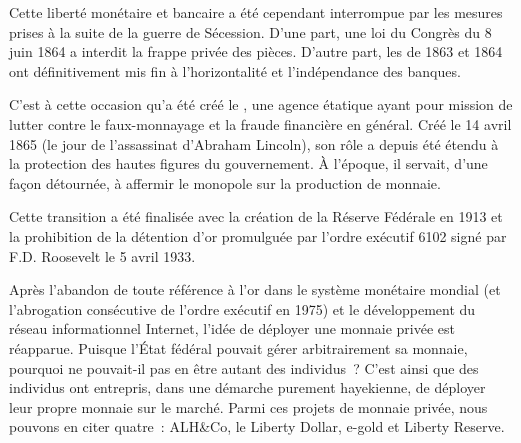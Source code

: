 Cette liberté monétaire et bancaire a été cependant interrompue par les mesures prises à la suite de la guerre de Sécession. D'une part, une loi du Congrès du 8 juin 1864 a interdit la frappe privée des pièces. D'autre part, les  de 1863 et 1864 ont définitivement mis fin à l'horizontalité et l'indépendance des banques.

C'est à cette occasion qu'a été créé le , une agence étatique ayant pour mission de lutter contre le faux-monnayage et la fraude financière en général. Créé le 14 avril 1865 (le jour de l'assassinat d'Abraham Lincoln), son rôle a depuis été étendu à la protection des hautes figures du gouvernement. À l'époque, il servait, d'une façon détournée, à affermir le monopole sur la production de monnaie.

Cette transition a été finalisée avec la création de la Réserve Fédérale en 1913 et la prohibition de la détention d'or promulguée par l'ordre exécutif 6102 signé par F.D. Roosevelt le 5 avril 1933.

Après l'abandon de toute référence à l'or dans le système monétaire mondial (et l'abrogation consécutive de l'ordre exécutif en 1975) et le développement du réseau informationnel Internet, l'idée de déployer une monnaie privée est réapparue. Puisque l'État fédéral pouvait gérer arbitrairement sa monnaie, pourquoi ne pouvait-il pas en être autant des individus~? C'est ainsi que des individus ont entrepris, dans une démarche purement hayekienne, de déployer leur propre monnaie sur le marché. Parmi ces projets de monnaie privée, nous pouvons en citer quatre~: ALH\&Co, le Liberty Dollar, e-gold et Liberty Reserve.

